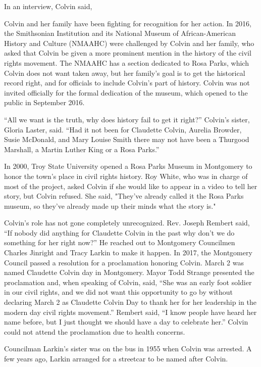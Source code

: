 In an interview, Colvin said,

Colvin and her family have been fighting for recognition for her action.
In 2016, the Smithsonian Institution and its National Museum of
African-American History and Culture (NMAAHC) were challenged by Colvin
and her family, who asked that Colvin be given a more prominent mention
in the history of the civil rights movement. The NMAAHC has a section
dedicated to Rosa Parks, which Colvin does not want taken away, but her
family's goal is to get the historical record right, and for officials
to include Colvin's part of history. Colvin was not invited officially
for the formal dedication of the museum, which opened to the public in
September 2016.

``All we want is the truth, why does history fail to get it right?''
Colvin's sister, Gloria Laster, said. ``Had it not been for Claudette
Colvin, Aurelia Browder, Susie McDonald, and Mary Louise Smith there may
not have been a Thurgood Marshall, a Martin Luther King or a Rosa
Parks.''

In 2000, Troy State University opened a Rosa Parks Museum in Montgomery
to honor the town's place in civil rights history. Roy White, who was in
charge of most of the project, asked Colvin if she would like to appear
in a video to tell her story, but Colvin refused. She said, "They've
already called it the Rosa Parks museum, so they've already made up
their minds what the story is."

Colvin's role has not gone completely unrecognized. Rev. Joseph Rembert
said, ``If nobody did anything for Claudette Colvin in the past why
don't we do something for her right now?'' He reached out to Montgomery
Councilmen Charles Jinright and Tracy Larkin to make it happen. In 2017,
the Montgomery Council passed a resolution for a proclamation honoring
Colvin. March 2 was named Claudette Colvin day in Montgomery. Mayor Todd
Strange presented the proclamation and, when speaking of Colvin, said,
``She was an early foot soldier in our civil rights, and we did not want
this opportunity to go by without declaring March 2 as Claudette Colvin
Day to thank her for her leadership in the modern day civil rights
movement.'' Rembert said, ``I know people have heard her name before,
but I just thought we should have a day to celebrate her.'' Colvin could
not attend the proclamation due to health concerns.

Councilman Larkin's sister was on the bus in 1955 when Colvin was
arrested. A few years ago, Larkin arranged for a streetcar to be named
after Colvin.\\
\hspace*{0.333em}

